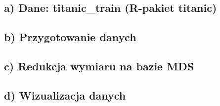\documentclass[
  12pt,
]{article}
\begin{document}
\subsection{a) Dane: titanic\_train (R-pakiet
titanic)}\label{a-dane-titanic_train-r-pakiet-titanic}

\subsection{b) Przygotowanie danych}\label{b-przygotowanie-danych}

\subsection{c) Redukcja wymiaru na bazie
MDS}\label{c-redukcja-wymiaru-na-bazie-mds}

\subsection{d) Wizualizacja danych}\label{d-wizualizacja-danych}
\end{document}
